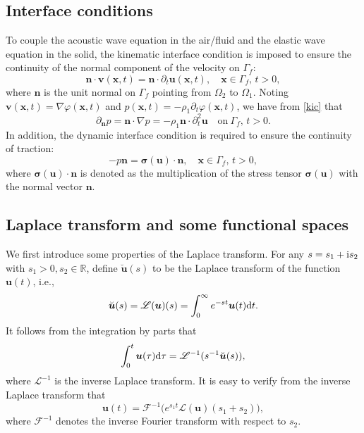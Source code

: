 \documentclass[final,leqno]{siamltex}
\begin{document}
\subsection{Interface conditions}

To couple the acoustic wave equation in the air/fluid and the elastic wave
equation in the solid, the kinematic interface condition is imposed to ensure
the continuity of the normal component of the
velocity on $\Gamma_f$:
\begin{equation}\label{kic}
 \boldsymbol n \cdot \boldsymbol v (\boldsymbol x, t) =\boldsymbol n \cdot
\partial_t  \boldsymbol u  (\boldsymbol x, t), \quad \boldsymbol x \in
\Gamma_f,\,t>0,
\end{equation}
where $\boldsymbol n$ is the unit normal on $\Gamma_f$
pointing from $\Omega_2$ to  $\Omega_1$. Noting $\boldsymbol v (\boldsymbol x,
t) =\nabla \varphi (\boldsymbol x, t)$ and $p (\boldsymbol x, t)=-\rho_1
\partial_t \varphi (\boldsymbol x, t)$, we have from \eqref{kic} that
\[
 \partial_{\boldsymbol n} p= \boldsymbol n \cdot \nabla p
=-\rho_1 \boldsymbol n \cdot \partial_t^2 \boldsymbol u
 \quad \text {on}~\Gamma_f,\, t>0.
\]
In addition, the dynamic interface condition is required to ensure the
continuity of traction:
\[
- p \boldsymbol n = \boldsymbol \sigma (\boldsymbol u)\cdot \boldsymbol  n,
\quad\boldsymbol x \in \Gamma_f,\, t>0,
\]
where $\boldsymbol \sigma (\boldsymbol u) \cdot \boldsymbol n$ is denoted as
the multiplication of the stress tensor $\boldsymbol \sigma (\boldsymbol u)$
with the normal vector $\boldsymbol n.$

\subsection{Laplace transform and some functional spaces}

We first  introduce some properties of the Laplace transform. For any
$s=s_1+{\rm i} s_2$ with $s_1>0, s_2\in\mathbb{R}$, define $\breve
{\boldsymbol u}(s)$ to be the Laplace transform of the function $\boldsymbol
u(t)$, i.e.,
\[
\breve {\boldsymbol u}(s) =\mathscr L (\boldsymbol u) (s)= \int_0^{\infty} e^{-s
t} \boldsymbol u (t) {\rm d} t.
\]
It follows from the integration by parts that
\begin{align*}
\int_0^t \boldsymbol u (\tau) {\rm d} \tau =\mathscr L^{-1} (s^{-1} \breve
{\boldsymbol u} (s)),
\end{align*}
where $\mathscr L^{-1}$ is the inverse Laplace transform. It is easy to verify
from the inverse Laplace transform that
\begin{equation*}
\boldsymbol u(t)=\mathscr F^{-1} \big( e^{s_1 t} \mathscr L (\boldsymbol u)
(s_1+s_2)\big),
\end{equation*}
where $\mathscr F ^{-1}$ denotes the inverse Fourier transform with respect to
$s_2.$
\end{document}
